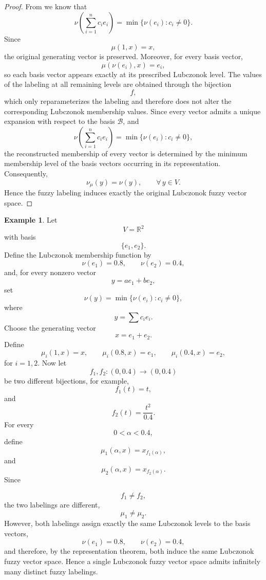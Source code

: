 \documentclass[preprint,12pt]{elsarticle}
\theoremstyle{definition}
\newtheorem{example}[theorem]{Example}
\begin{document}
	\begin{proof}
		From\cite{Lubczonok1990}   we know that 	\[
		\nu\!\left(\sum_{i=1}^{n}c_ie_i\right)
		=
		\min\{\nu(e_i):c_i\neq0\}.
		\]
		Since
		\[
		\mu(1,x)=x,
		\]
		the original generating vector is preserved.
		Moreover, for every basis vector,
		\[
		\mu(\nu(e_i),x)=e_i,
		\]
		so each basis vector appears exactly at its prescribed Lubczonok level.
		The values of the labeling at all remaining levels are obtained through
		the bijection
		\[
		f,
		\]
		which only reparameterizes the labeling and therefore does not alter the
		corresponding Lubczonok membership values.
		Since every vector admits a unique expansion with respect to the basis
		\(\mathcal B\), and
		\[
		\nu\!\left(\sum_{i=1}^{n}c_ie_i\right)
		=
		\min\{\nu(e_i):c_i\neq0\},
		\]
		the reconstructed membership of every vector is determined by the
		minimum membership level of the basis vectors occurring in its
		representation. Consequently,
		\[
		\nu_\mu(y)=\nu(y),
		\qquad
		\forall\,y\in V.
		\]
		Hence the fuzzy labeling induces exactly the original Lubczonok fuzzy
		vector space.
		
	\end{proof}
\begin{example}
	Let
	\[
	V=\mathbb{R}^2
	\]
	with basis
	\[
	\{e_1,e_2\}.
	\]
	Define the Lubczonok membership function by
	\[
	\nu(e_1)=0.8,
	\qquad
	\nu(e_2)=0.4,
	\]
	and, for every nonzero vector
	\[
	y=ae_1+be_2,
	\]
	set
	\[
	\nu(y)=
	\min\{\nu(e_i):c_i\neq0\},
	\]
	where
	\[
	y=\sum c_ie_i.
	\]
	Choose the generating vector
	\[
	x=e_1+e_2.
	\]
	Define
	\[
	\mu_i(1,x)=x,
	\qquad
	\mu_i(0.8,x)=e_1,
	\qquad
	\mu_i(0.4,x)=e_2,
	\]
	for \(i=1,2\).
	Now let
	\[
	f_1,f_2:(0,0.4)\longrightarrow(0,0.4)
	\]
	be two different bijections, for example,
	\[
	f_1(t)=t,
	\]
	and
	\[
	f_2(t)=\frac{t^2}{0.4}.
	\]
	For every
	\[
	0<\alpha<0.4,
	\]
	define
	\[
	\mu_1(\alpha,x)=x_{f_1(\alpha)},
	\]
	and
	\[
	\mu_2(\alpha,x)=x_{f_2(\alpha)}.
	\]
	Since
	
	\[
	f_1\neq f_2,
	\]
	the two labelings are different,
	\[
	\mu_1\neq\mu_2.
	\]
	However, both labelings assign exactly the same Lubczonok levels to the
	basis vectors,
	\[
	\nu(e_1)=0.8,
	\qquad
	\nu(e_2)=0.4,
	\]
	and therefore, by the representation theorem, both induce the same
	Lubczonok fuzzy vector space.
	Hence a single Lubczonok fuzzy vector space admits infinitely many
	distinct fuzzy labelings.
	
\end{example}
\end{document}
